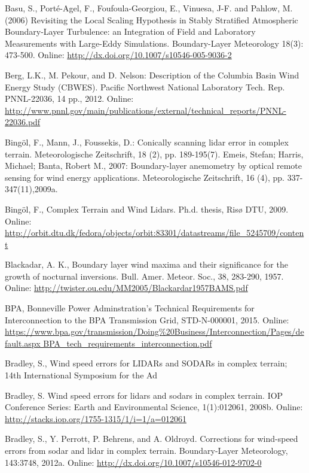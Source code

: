 Basu, S., Porté-Agel, F., Foufoula-Georgiou, E., Vinuesa, J-F. and Pahlow, M. (2006) Revisiting the Local Scaling Hypothesis in Stably Stratified Atmospheric Boundary-Layer Turbulence: an Integration of Field and Laboratory Measurements with Large-Eddy Simulations. Boundary-Layer Meteorology 18(3): 473-500.          
Online: \small{\url{http://dx.doi.org/10.1007/s10546-005-9036-2}}

Berg, L.K., M. Pekour, and D. Nelson: Description of the Columbia Basin Wind Energy Study (CBWES). Pacific Northwest National Laboratory Tech. Rep. PNNL-22036, 14 pp., 2012. Online: \small{\url{http://www.pnnl.gov/main/publications/external/technical_reports/PNNL-22036.pdf}}

Bing{\"o}l, F., Mann, J., Foussekis, D.: Conically scanning lidar error in complex terrain. Meteorologische Zeitschrift, 18 (2), pp. 189-195(7). Emeis, Stefan; Harris, Michael; Banta, Robert M., 2007: Boundary-layer anemometry by optical remote sensing for wind energy applications. Meteorologische Zeitschrift, 16 (4), pp. 337-347(11),2009a.

Bing{\"o}l, F., Complex Terrain and Wind Lidars. Ph.d. thesis, Risø DTU, 2009. Online: \small{\url{http://orbit.dtu.dk/fedora/objects/orbit:83301/datastreams/file_5245709/content}}

Blackadar, A. K., Boundary layer wind maxima and their significance for the growth of nocturnal inversions. Bull. Amer. Meteor. Soc., 38, 283-290, 1957. Online: \small{\url{http://twister.ou.edu/MM2005/Blackardar1957BAMS.pdf}}

BPA, Bonneville Power Adminstration's Technical Requirements for Interconnection to the BPA Transmission Grid, STD-N-000001, 2015. Online: \small{\url{https://www.bpa.gov/transmission/Doing\%20Business/Interconnection/Pages/default.aspx BPA_tech_requirements_interconnection.pdf}}

Bradley, S., Wind speed errors for LIDARs and SODARs in complex terrain; 14th International Symposium for the Ad

Bradley, S. Wind speed errors for lidars and sodars in complex terrain. IOP Conference Series: Earth and Environmental Science, 1(1):012061, 2008b. Online: \small{\url{http://stacks.iop.org/1755-1315/1/i=1/a=012061}}

Bradley, S., Y. Perrott, P. Behrens, and A. Oldroyd. Corrections for wind-speed errors from sodar and lidar in complex terrain. Boundary-Layer Meteorology, 143:37­48, 2012a. 
Online: \small{\url{http://dx.doi.org/10.1007/s10546-012-9702-0}}

